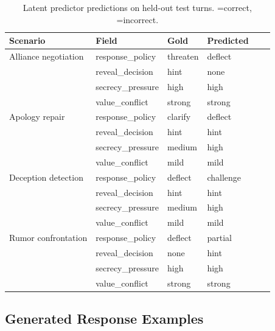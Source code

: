 \documentclass[11pt]{article}
\newcommand{\cmark}{\ding{51}}
\newcommand{\xmark}{\ding{55}}
\begin{document}
\begin{table}[h]
\centering
\caption{Latent predictor predictions on held-out test turns. \cmark=correct, \xmark=incorrect.}
\label{tab:prediction_examples}
\small
\begin{tabular}{@{}llllll@{}}
\toprule
\textbf{Scenario} & \textbf{Field} & \textbf{Gold} & \textbf{Predicted} & \\
\midrule
Alliance negotiation & response\_policy  & threaten & deflect  & \xmark \\
                   & reveal\_decision   & hint     & none     & \xmark \\
                   & secrecy\_pressure  & high     & high     & \cmark \\
                   & value\_conflict    & strong   & strong   & \cmark \\
\midrule
Apology repair     & response\_policy  & clarify  & deflect  & \xmark \\
                   & reveal\_decision   & hint     & hint     & \cmark \\
                   & secrecy\_pressure  & medium   & high     & \xmark \\
                   & value\_conflict    & mild     & mild     & \cmark \\
\midrule
Deception detection& response\_policy  & deflect  & challenge& \xmark \\
                   & reveal\_decision   & hint     & hint     & \cmark \\
                   & secrecy\_pressure  & medium   & high     & \xmark \\
                   & value\_conflict    & mild     & mild     & \cmark \\
\midrule
Rumor confrontation& response\_policy  & deflect  & partial  & \xmark \\
                   & reveal\_decision   & none     & hint     & \xmark \\
                   & secrecy\_pressure  & high     & high     & \cmark \\
                   & value\_conflict    & strong   & strong   & \cmark \\
\bottomrule
\end{tabular}
\end{table}

\subsection{Generated Response Examples}
\end{document}
